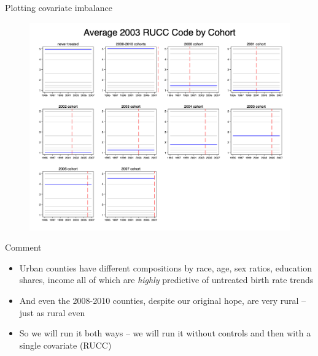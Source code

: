 \documentclass{beamer}
\begin{document}
\begin{frame}{Plotting covariate imbalance}

\begin{figure}[ht]
    \centering
    \includegraphics[width=\linewidth, height=0.8\textheight, keepaspectratio]{./lecture_includes/pretty_rucc}
\end{figure}

\end{frame}



\begin{frame}{Comment}

\begin{itemize}

\item Urban counties have different compositions by race, age, sex ratios, education shares, income all of which are \emph{highly} predictive of untreated birth rate trends
\item And even the 2008-2010 counties, despite our original hope, are very rural -- just as rural even
\item So we will run it both ways -- we will run it without controls and then with a single covariate (RUCC)

\end{itemize}

\end{frame}
\end{document}
